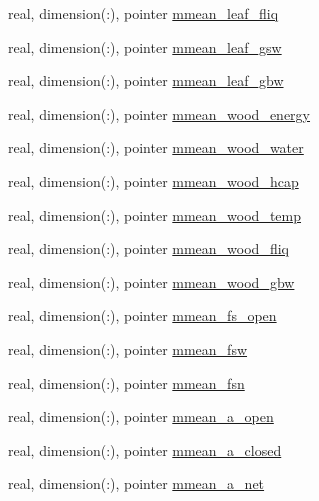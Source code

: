 \begin{DoxyCompactItemize}
\item 
real, dimension(\+:), pointer \hyperlink{structed__state__vars_1_1edtype_aed3ad6d092aaf52b611b712722780fa7}{mmean\+\_\+leaf\+\_\+fliq}
\item 
real, dimension(\+:), pointer \hyperlink{structed__state__vars_1_1edtype_acc69a0145503e24cf761fbb88f51e9c3}{mmean\+\_\+leaf\+\_\+gsw}
\item 
real, dimension(\+:), pointer \hyperlink{structed__state__vars_1_1edtype_a9a796c0f1783c1a8776552848347e59b}{mmean\+\_\+leaf\+\_\+gbw}
\item 
real, dimension(\+:), pointer \hyperlink{structed__state__vars_1_1edtype_a54f1500c0b6ec7e7e1c4b5fb08667f20}{mmean\+\_\+wood\+\_\+energy}
\item 
real, dimension(\+:), pointer \hyperlink{structed__state__vars_1_1edtype_a35bf0037af7b5c7e77123425a8a9fba1}{mmean\+\_\+wood\+\_\+water}
\item 
real, dimension(\+:), pointer \hyperlink{structed__state__vars_1_1edtype_a66974b17f848df4cd2f944825c738fba}{mmean\+\_\+wood\+\_\+hcap}
\item 
real, dimension(\+:), pointer \hyperlink{structed__state__vars_1_1edtype_a8638199727d1f31515a34f53ffba60d4}{mmean\+\_\+wood\+\_\+temp}
\item 
real, dimension(\+:), pointer \hyperlink{structed__state__vars_1_1edtype_a4afe6fe729010ad603ad080402c69429}{mmean\+\_\+wood\+\_\+fliq}
\item 
real, dimension(\+:), pointer \hyperlink{structed__state__vars_1_1edtype_a8fc994ad0093bdd20447b2876fff8fde}{mmean\+\_\+wood\+\_\+gbw}
\item 
real, dimension(\+:), pointer \hyperlink{structed__state__vars_1_1edtype_a01c90762f66ec96e6b02c5ed5b4e0a57}{mmean\+\_\+fs\+\_\+open}
\item 
real, dimension(\+:), pointer \hyperlink{structed__state__vars_1_1edtype_ad4ad4d704fa0edbc9cfb65f50aefa667}{mmean\+\_\+fsw}
\item 
real, dimension(\+:), pointer \hyperlink{structed__state__vars_1_1edtype_a4eae968200c72b133ec87d32cf75103a}{mmean\+\_\+fsn}
\item 
real, dimension(\+:), pointer \hyperlink{structed__state__vars_1_1edtype_a81718c7d9f502acae4b97e2f80534076}{mmean\+\_\+a\+\_\+open}
\item 
real, dimension(\+:), pointer \hyperlink{structed__state__vars_1_1edtype_a7f3dc88ff18c1554aed190aefe240081}{mmean\+\_\+a\+\_\+closed}
\item 
real, dimension(\+:), pointer \hyperlink{structed__state__vars_1_1edtype_a0fb27ae5d10944eb1c5795a69aee63d1}{mmean\+\_\+a\+\_\+net}

\end{DoxyCompactItemize}
